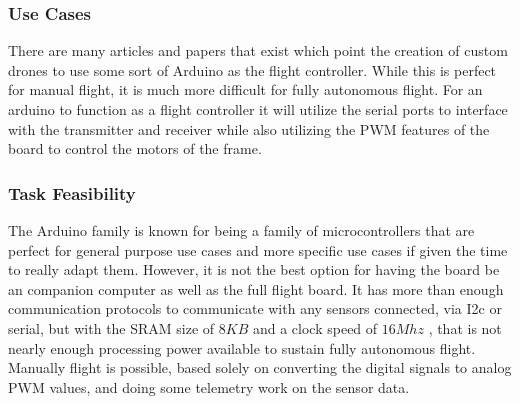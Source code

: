 \documentclass[conference,12pt, ]{IEEEtran}
\begin{document}
\subsubsection{Use Cases}
There are many articles and papers that exist which point the creation of custom drones to use some sort of Arduino as the flight controller. While this is perfect for manual flight, it is much more difficult for fully autonomous flight. For an arduino to function as a flight controller it will utilize the serial ports to interface with the transmitter and receiver while also utilizing the PWM features of the board to control the motors of the frame. 

\subsubsection{Task Feasibility}
The Arduino family is known for being a family of microcontrollers that are perfect for general purpose use cases and more specific use cases if given the time to really adapt them. However, it is not the best option for having the board be an companion computer as well as the full flight board. It has more than enough communication protocols to communicate with any sensors connected, via I2c or serial, but with the SRAM size of $8KB$ and a clock speed of $16Mhz$ \cite{arduino}, that is not nearly enough processing power available to sustain fully autonomous flight. Manually flight is possible, based solely on converting the digital signals to analog PWM values, and doing some telemetry work on the sensor data. 
\end{document}
